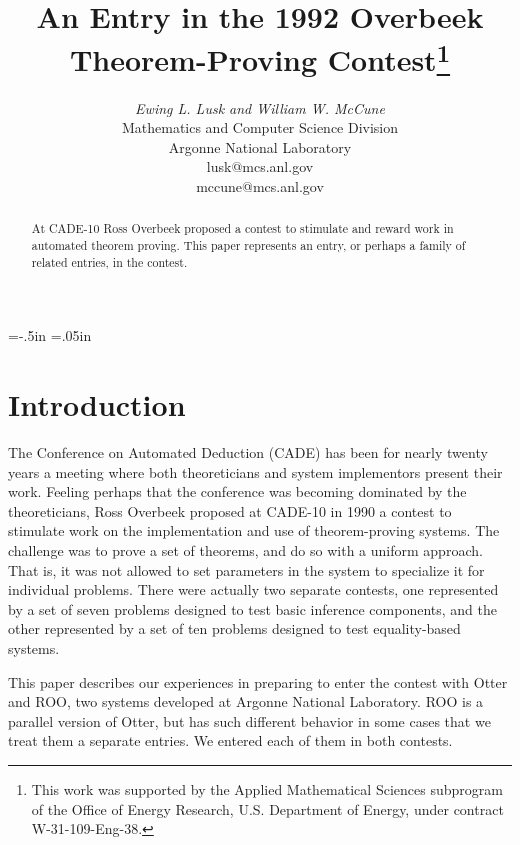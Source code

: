 \textwidth=6in
\textheight=9in
\hoffset=-.5in
\voffset=-1in
\parskip=.05in


\title{\Large \bf An Entry in the 1992 Overbeek Theorem-Proving Contest\thanks{This
          work was supported by the Applied 
          Mathematical Sciences subprogram of the Office of Energy Research,
          U.S. Department of Energy, under contract W-31-109-Eng-38.}}
\author{{\it Ewing L. Lusk {\rm and} William W. McCune} \\
        Mathematics and Computer Science Division \\
        Argonne National Laboratory \\
        lusk@mcs.anl.gov \\
        mccune@mcs.anl.gov}

\maketitle

\begin{abstract}
At CADE-10 Ross Overbeek proposed a contest to stimulate and reward
work in automated theorem proving.  This paper represents an entry, or
perhaps a family of related entries, in the contest.
\end{abstract}

\thispagestyle{empty}

\section{Introduction}
The Conference on Automated Deduction (CADE) has been for nearly
twenty years a meeting where both theoreticians and system
implementors present their work.  Feeling perhaps that the conference
was becoming dominated by the theoreticians, Ross Overbeek proposed at
CADE-10 in 1990 a contest to stimulate work on the implementation and
use of theorem-proving systems.  The challenge was to prove a set of
theorems, and do so with a uniform approach.  That is, it was not
allowed to set parameters in the system to specialize it for
individual problems.  There were actually two separate contests, one
represented by a set of seven problems designed to test basic
inference components, and the other represented by a set of ten
problems designed to test equality-based systems.

This paper describes our experiences in preparing to enter the contest
with Otter\cite{otter2-guide,otter22} and ROO\cite{roo-exp,roo-tm}, two
systems developed at Argonne National Laboratory.  ROO is a parallel
version of Otter, but has such different behavior in some cases that
we treat them a separate entries.  We entered each of them in both
contests.

